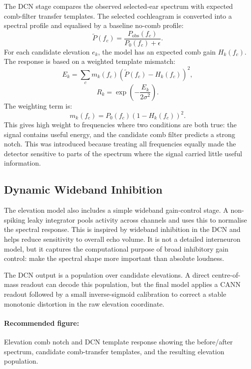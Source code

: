 The DCN stage compares the observed selected-ear spectrum with expected comb-filter transfer templates. The selected cochleagram is converted into a spectral profile and equalised by a baseline no-comb profile:
\begin{equation}
    \tilde{P}(f_c) = \frac{P_{\text{obs}}(f_c)}{P_0(f_c)+\epsilon}.
\end{equation}
For each candidate elevation $e_k$, the model has an expected comb gain $H_k(f_c)$. The response is based on a weighted template mismatch:
\begin{equation}
    E_k = \sum_c m_k(f_c)\left(\tilde{P}(f_c)-H_k(f_c)\right)^2,
\end{equation}
\begin{equation}
    R_k = \exp\left(-\frac{E_k}{2\sigma^2}\right).
\end{equation}
The weighting term is:
\begin{equation}
    m_k(f_c)=P_0(f_c)\left(1-H_k(f_c)\right)^2.
\end{equation}
This gives high weight to frequencies where two conditions are both true: the signal contains useful energy, and the candidate comb filter predicts a strong notch. This was introduced because treating all frequencies equally made the detector sensitive to parts of the spectrum where the signal carried little useful information.

\subsection{Dynamic Wideband Inhibition}

The elevation model also includes a simple wideband gain-control stage. A non-spiking leaky integrator pools activity across channels and uses this to normalise the spectral response. This is inspired by wideband inhibition in the DCN and helps reduce sensitivity to overall echo volume. It is not a detailed interneuron model, but it captures the computational purpose of broad inhibitory gain control: make the spectral shape more important than absolute loudness.

The DCN output is a population over candidate elevations. A direct centre-of-mass readout can decode this population, but the final model applies a CANN readout followed by a small inverse-sigmoid calibration to correct a stable monotonic distortion in the raw elevation coordinate.

\paragraph{Recommended figure:} Elevation comb notch and DCN template response showing the before/after spectrum, candidate comb-transfer templates, and the resulting elevation population.

